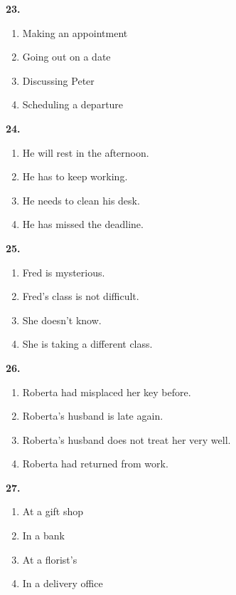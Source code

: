 \documentclass[12pt]{article}
\begin{document}
\par
\vspace{0.25\baselineskip}
\noindent\textbf{23.}
\begin{enumerate}[label=(\Alph*),leftmargin=*,itemsep=0.2em]
\item Making an appointment
\item Going out on a date
\item Discussing Peter
\item Scheduling a departure
\end{enumerate}
\par
\vspace{0.25\baselineskip}
\noindent\textbf{24.}
\begin{enumerate}[label=(\Alph*),leftmargin=*,itemsep=0.2em]
\item He will rest in the afternoon.
\item He has to keep working.
\item He needs to clean his desk.
\item He has missed the deadline.
\end{enumerate}
\par
\vspace{0.25\baselineskip}
\noindent\textbf{25.}
\begin{enumerate}[label=(\Alph*),leftmargin=*,itemsep=0.2em]
\item Fred is mysterious.
\item Fred's class is not difficult.
\item She doesn't know.
\item She is taking a different class.
\end{enumerate}
\par
\vspace{0.25\baselineskip}
\noindent\textbf{26.}
\begin{enumerate}[label=(\Alph*),leftmargin=*,itemsep=0.2em]
\item Roberta had misplaced her key before.
\item Roberta's husband is late again.
\item Roberta's husband does not treat her very well.
\item Roberta had returned from work.
\end{enumerate}
\par
\vspace{0.25\baselineskip}
\noindent\textbf{27.}
\begin{enumerate}[label=(\Alph*),leftmargin=*,itemsep=0.2em]
\item At a gift shop
\item In a bank
\item At a florist's
\item In a delivery office
\end{enumerate}
\end{document}
